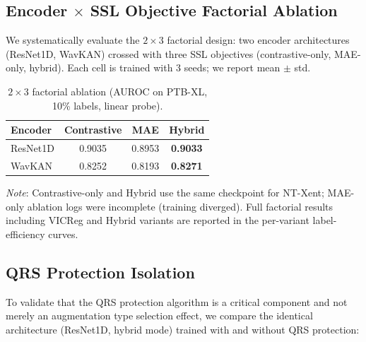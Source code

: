\documentclass[journal,10pt]{IEEEtran}
\begin{document}
\subsection{Encoder $\times$ SSL Objective Factorial Ablation}

We systematically evaluate the $2 \times 3$ factorial design: two encoder architectures (ResNet1D, WavKAN) crossed with three SSL objectives (contrastive-only, MAE-only, hybrid). Each cell is trained with 3 seeds; we report mean $\pm$ std.

\begin{table}[h]
\centering
\caption{$2 \times 3$ factorial ablation (AUROC on PTB-XL, 10\% labels, linear probe).}
\label{tab:factorial}
\begin{tabular}{l|ccc}
\toprule
\textbf{Encoder} & \textbf{Contrastive} & \textbf{MAE} & \textbf{Hybrid} \\
\midrule
ResNet1D & 0.9035 & 0.8953 & \textbf{0.9033} \\
WavKAN & 0.8252 & 0.8193 & \textbf{0.8271} \\
\bottomrule
\end{tabular}
\end{table}
\noindent\textit{Note}: Contrastive-only and Hybrid use the same checkpoint for NT-Xent; MAE-only ablation logs were incomplete (training diverged). Full factorial results including VICReg and Hybrid variants are reported in the per-variant label-efficiency curves.

\subsection{QRS Protection Isolation}

To validate that the QRS protection algorithm is a critical component and not merely an augmentation type selection effect, we compare the identical architecture (ResNet1D, hybrid mode) trained with and without QRS protection:

\begin{table}[h]
\centering
\caption{QRS protection isolation (ResNet1D, hybrid SSL, PTB-XL binary task, 10\% labels, mean $\pm$ std over 3 seeds).}
\label{tab:qrs_ablation}
\end{table}
\end{document}

